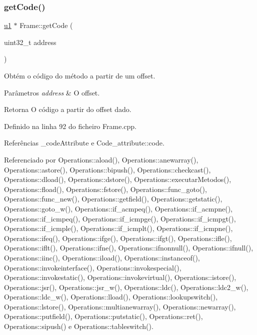 \subsubsection{\texorpdfstring{get\+Code()}{getCode()}}
{\footnotesize\ttfamily \hyperlink{BasicTypes_8h_ad9f4cdb6757615aae2fad89dab3c5470}{u1} $\ast$ Frame\+::get\+Code (\begin{DoxyParamCaption}\item[{uint32\+\_\+t}]{address }\end{DoxyParamCaption})}



Obtém o código do método a partir de um offset. 


\begin{DoxyParams}{Parâmetros}
{\em address} & O offset. \\
\hline
\end{DoxyParams}
\begin{DoxyReturn}{Retorna}
O código a partir do offset dado. 
\end{DoxyReturn}


Definido na linha 92 do ficheiro Frame.\+cpp.



Referências \+\_\+code\+Attribute e Code\+\_\+attribute\+::code.



Referenciado por Operations\+::aload(), Operations\+::anewarray(), Operations\+::astore(), Operations\+::bipush(), Operations\+::checkcast(), Operations\+::dload(), Operations\+::dstore(), Operations\+::executar\+Metodos(), Operations\+::fload(), Operations\+::fstore(), Operations\+::func\+\_\+goto(), Operations\+::func\+\_\+new(), Operations\+::getfield(), Operations\+::getstatic(), Operations\+::goto\+\_\+w(), Operations\+::if\+\_\+acmpeq(), Operations\+::if\+\_\+acmpne(), Operations\+::if\+\_\+icmpeq(), Operations\+::if\+\_\+icmpge(), Operations\+::if\+\_\+icmpgt(), Operations\+::if\+\_\+icmple(), Operations\+::if\+\_\+icmplt(), Operations\+::if\+\_\+icmpne(), Operations\+::ifeq(), Operations\+::ifge(), Operations\+::ifgt(), Operations\+::ifle(), Operations\+::iflt(), Operations\+::ifne(), Operations\+::ifnonnull(), Operations\+::ifnull(), Operations\+::iinc(), Operations\+::iload(), Operations\+::instanceof(), Operations\+::invokeinterface(), Operations\+::invokespecial(), Operations\+::invokestatic(), Operations\+::invokevirtual(), Operations\+::istore(), Operations\+::jsr(), Operations\+::jsr\+\_\+w(), Operations\+::ldc(), Operations\+::ldc2\+\_\+w(), Operations\+::ldc\+\_\+w(), Operations\+::lload(), Operations\+::lookupswitch(), Operations\+::lstore(), Operations\+::multianewarray(), Operations\+::newarray(), Operations\+::putfield(), Operations\+::putstatic(), Operations\+::ret(), Operations\+::sipush() e Operations\+::tableswitch().

